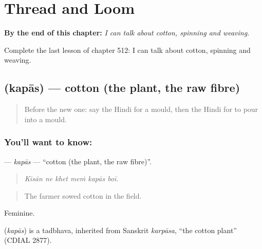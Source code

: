 
\chapter{Thread and Loom}
\label{ch:hi-thread-and-loom}

\begin{chapteropening}
\textbf{By the end of this chapter:} \emph{I can talk about cotton, spinning and weaving.}

Complete the last lesson of chapter 512: I can talk about cotton, spinning and weaving.
\end{chapteropening}

\section[\texorpdfstring{\hi{कपास} (kapās)}{कपास (kapās)}]{ (kapās) — cotton (the plant, the raw fibre)}

\label{lesson:HI-C512-kapas}



\begin{quote}
Before the new one: say the Hindi for a mould, then the Hindi for to pour into a mould.
\end{quote}

\subsection*{You'll want to know: }
\textbf{} — \emph{kapās} — \textquotedblleft{}cotton (the plant, the raw fibre)\textquotedblright{}.

\begin{quote}
     
\end{quote}

\begin{quote}
\emph{Kisān ne khet meṁ kapās boī.}
\end{quote}

\begin{quote}
The farmer sowed cotton in the field.
\end{quote}

Feminine.

\begin{cousinweb}
\textbf{} (\emph{kapās}) is a tadbhava, inherited from Sanskrit \emph{karpāsa}, \textquotedblleft{}the cotton plant\textquotedblright{} (CDIAL 2877).
\end{cousinweb}


